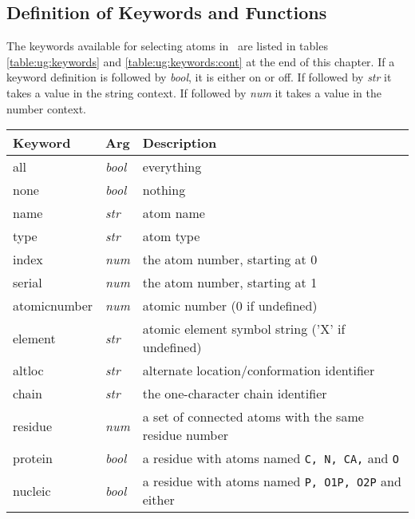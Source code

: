 \subsection{Definition of Keywords and Functions}
The keywords available for selecting atoms in \VMD\ are listed in tables
\ref{table:ug:keywords} and \ref{table:ug:keywords:cont} at the end of
this chapter.
If a keyword definition is followed by {\it bool}, it is either
on or off.  If followed by {\it str} it takes a value in the
string context.  If followed by {\it num} it takes a value in the
number context.


\begin{table}[htb]
\hspace{0.5in}
\begin{tabular}{|p{.9 in}| p{.4 in}| p{4.5in}| } 
\hline
Keyword & Arg & Description \\ 
\hline \hline
all           & {\it bool}  & everything \\
none          & {\it bool}  & nothing \\
name          & {\it str}   & atom name \\
type          & {\it str}   & atom type \\
index         & {\it num}   & the atom number, starting at 0 \\
serial        & {\it num}   & the atom number, starting at 1 \\
atomicnumber  & {\it num}   & atomic number (0 if undefined) \\
element       & {\it str}   & atomic element symbol string ('X' if undefined) \\
altloc        & {\it str}   & alternate location/conformation identifier \\
chain         & {\it str}   & the one-character chain identifier \\
residue       & {\it num}   & a set of connected atoms with the same residue number \\
protein       & {\it bool}  & a residue with atoms named {\tt C, N, CA,} and {\tt O} \\
nucleic       & {\it bool}  & a residue with atoms named {\tt P, O1P, O2P} and either \\

\end{tabular}
\end{table}
